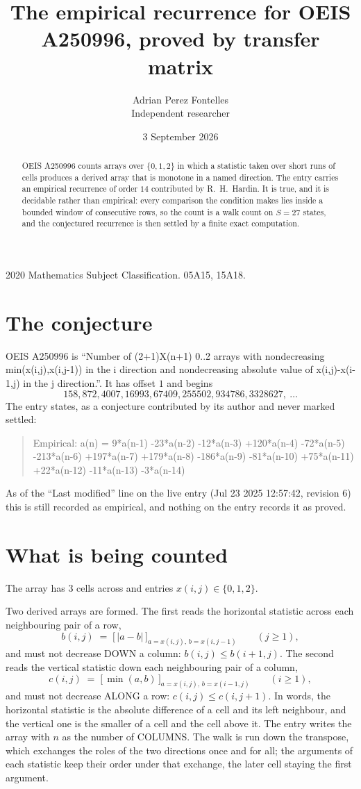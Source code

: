 \documentclass[11pt,a4paper]{article}
\title{The empirical recurrence for OEIS A250996, proved by transfer matrix}
\author{Adrian Perez Fontelles\\ \small Independent researcher}
\date{3 September 2026}
\theoremstyle{plain}
\theoremstyle{definition}
\begin{document}
\maketitle

\begin{abstract}
OEIS A250996 counts arrays over $\{0,1,2\}$ in which a statistic taken over short runs
of cells produces a derived array that is monotone in a named direction. The entry carries an
empirical recurrence of order $14$ contributed by R.~H.~Hardin. It is true, and it is
decidable rather than empirical: every comparison the condition makes lies inside a bounded
window of consecutive rows, so the count is a walk count on $S=27$ states, and the
conjectured recurrence is then settled by a finite exact computation.
\end{abstract}

\noindent\small 2020 Mathematics Subject Classification. 05A15, 15A18.\normalsize

\section{The conjecture}

OEIS A250996 is ``Number of (2+1)X(n+1) 0..2 arrays with nondecreasing min(x(i,j),x(i,j-1)) in the i direction and nondecreasing absolute value of x(i,j)-x(i-1,j) in the j direction.''. It has offset $1$ and begins
\[
158, 872, 4007, 16993, 67409, 255502, 934786, 3328627,\ \dots
\]
The entry states, as a conjecture contributed by its author and never marked settled:
\begin{quote}
Empirical: a(n) = 9*a(n-1) -23*a(n-2) -12*a(n-3) +120*a(n-4) -72*a(n-5) -213*a(n-6) +197*a(n-7) +179*a(n-8) -186*a(n-9) -81*a(n-10) +75*a(n-11) +22*a(n-12) -11*a(n-13) -3*a(n-14)
\end{quote}
As of the ``Last modified'' line on the live entry (Jul 23 2025 12:57:42, revision 6) this is still
recorded as empirical, and nothing on the entry records it as proved.

\section{What is being counted}

The array has $3$ cells across and entries $x(i,j)\in\{0,1,2\}$.

Two derived arrays are formed. The first reads the horizontal statistic across each
neighbouring pair of a row,
\[
b(i,j)\;=\;\bigl[\,\lvert a-b\rvert\,\bigr]_{a=x(i,j),\,b=x(i,j-1)}\qquad (j\ge1),
\]
and must not decrease DOWN a column: $b(i,j)\le b(i{+}1,j)$. The second reads the vertical
statistic down each neighbouring pair of a column,
\[
c(i,j)\;=\;\bigl[\,\min(a,b)\,\bigr]_{a=x(i,j),\,b=x(i{-}1,j)}\qquad (i\ge1),
\]
and must not decrease ALONG a row: $c(i,j)\le c(i,j{+}1)$. In words, the horizontal statistic
is the absolute difference of a cell and its left neighbour, and the vertical one is
the smaller of a cell and the cell above it. The entry writes the array with $n$ as the number of COLUMNS. The walk is run down the transpose, which exchanges the roles of the two directions once and for all; the arguments of each statistic keep their order under that exchange, the later cell staying the first argument.
\end{document}
